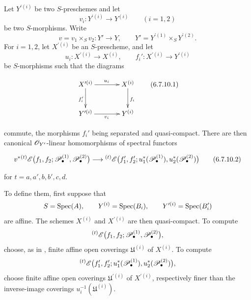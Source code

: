 \begin{env}[6.7.10]
\label{III.6.7.10}
Let $Y^{\prime(i)}$ be two $S$-preschemes and let
\[
  v_i:Y^{\prime(i)}\longrightarrow Y^{(i)}
  \qquad (i=1,2)
\]
be two $S$-morphisms.  Write
\[
  v=v_1\times_Sv_2:Y'\longrightarrow Y,
  \qquad
  Y'=Y^{\prime(1)}\times_SY^{\prime(2)}.
\]
For $i=1,2$, let $X^{\prime(i)}$ be an $S$-prescheme, and let
\[
  u_i:X^{\prime(i)}\longrightarrow X^{(i)},
  \qquad
  f_i':X^{\prime(i)}\longrightarrow Y^{\prime(i)}
\]
be $S$-morphisms such that the diagrams
\begin{env}[6.7.10.1]
\label{III.6.7.10.1}
\[
\xymatrix@C=36pt@R=28pt{
  X^{\prime(i)} \ar[r]^{u_i}\ar[d]_{f_i'}
  & X^{(i)}\ar[d]^{f_i}
  \\
  Y^{\prime(i)} \ar[r]_{v_i}
  & Y^{(i)}
}
\tag{6.7.10.1}\label{III.6.7.10.1.eq}
\]
\end{env}
commute, the morphisms $f_i'$ being separated and quasi-compact.
There are then canonical $\mathscr{O}_{Y'}$-linear homomorphisms of
spectral functors
\begin{env}[6.7.10.2]
\label{III.6.7.10.2}
\[
  v^*
  {}^{(t)}\sh E
  \bigl(
    f_1,f_2;
    \sh P_\bullet^{(1)},\sh P_\bullet^{(2)}
  \bigr)
  \longrightarrow
  {}^{(t)}\sh E
  \bigl(
    f_1',f_2';
    u_1^*(\sh P_\bullet^{(1)}),
    u_2^*(\sh P_\bullet^{(2)})
  \bigr)
  \tag{6.7.10.2}\label{III.6.7.10.2.eq}
\]
\end{env}
for $t=a,a',b,b',c,d$.

To define them, first suppose that
\[
  S=\operatorname{Spec}(A),\qquad
  Y^{(i)}=\operatorname{Spec}(B_i),\qquad
  Y^{\prime(i)}=\operatorname{Spec}(B_i')
\]
are affine.  The schemes $X^{(i)}$ and $X^{\prime(i)}$ are then
quasi-compact.  To compute
\[
  {}^{(t)}\mathscr{E}
  \bigl(
    f_1,f_2;
    \mathscr{P}_\bullet^{(1)},\mathscr{P}_\bullet^{(2)}
  \bigr),
\]
choose, as in , finite affine open coverings
$\mathfrak U^{(i)}$ of $X^{(i)}$.  To compute
\[
  {}^{(t)}\mathscr{E}
  \bigl(
    f_1',f_2';
    u_1^*(\mathscr{P}_\bullet^{(1)}),
    u_2^*(\mathscr{P}_\bullet^{(2)})
  \bigr),
\]
choose finite affine open coverings $\mathfrak U^{\prime(i)}$ of
$X^{\prime(i)}$, respectively finer than the inverse-image
coverings $u_i^{-1}(\mathfrak U^{(i)})$.



\end{env}
